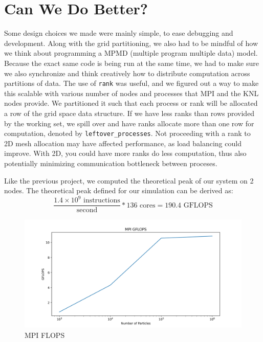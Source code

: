 \documentclass{article}
\begin{document}
\section{Can We Do Better?}
Some design choices we made were mainly simple, to ease debugging and development. Along with the grid partitioning, we also had to be mindful of how we think about programming a MPMD (multiple program multiple data) model. Because the exact same code is being run at the same time, we had to make sure we also synchronize and think creatively how to distribute computation across partitions of data. The use of \verb|rank| was useful, and we figured out a way to make this scalable with various number of nodes and processes that MPI and the KNL nodes provide. We partitioned it such that each process or rank will be allocated a row of the grid space data structure. If we have less ranks than rows provided by the working set, we spill over and have ranks allocate more than one row for computation, denoted by \verb|leftover_processes|. Not proceeding with a rank to 2D mesh allocation may have affected performance, as load balancing could improve. With 2D, you could have more ranks do less computation, thus also potentially minimizing communication bottleneck between proceses.

Like the previous project, we computed the theoretical peak of our system on 2 nodes. The theoretical peak defined for our simulation can be derived as:
$$\frac{1.4 \times 10^9 \textrm{ instructions}}{\textrm{second}} * 136 \textrm{ cores} = 190.4 \textrm{ GFLOPS}$$

\begin{figure}[H]
\centering
\includegraphics[width=6in]{figures/mpi_flops.png}
\caption{MPI FLOPS}
\label{fig:mpi-flops}
\end{figure}
\end{document}
